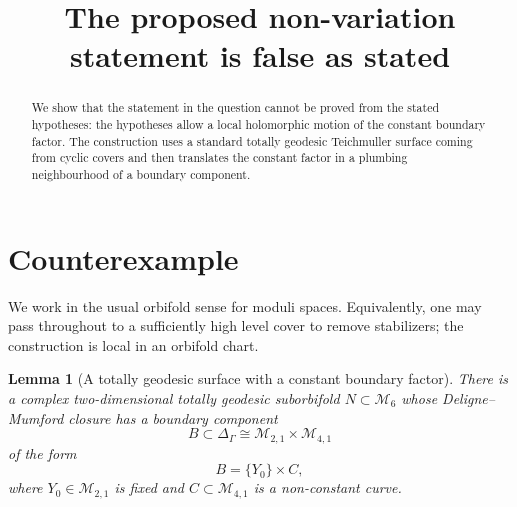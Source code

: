 \documentclass[11pt]{article}
\newtheorem{lemma}{Lemma}
\begin{document}
\title{The proposed non-variation statement is false as stated}
\author{}
\date{}
\maketitle

\begin{abstract}
We show that the statement in the question cannot be proved from the
stated hypotheses: the hypotheses allow a local holomorphic motion of the
constant boundary factor.  The construction uses a standard totally
geodesic Teichmuller surface coming from cyclic covers and then translates
the constant factor in a plumbing neighbourhood of a boundary component.
\end{abstract}

\section*{Counterexample}

We work in the usual orbifold sense for moduli spaces.  Equivalently, one
may pass throughout to a sufficiently high level cover to remove stabilizers;
the construction is local in an orbifold chart.

\begin{lemma}[A totally geodesic surface with a constant boundary factor]
There is a complex two-dimensional totally geodesic suborbifold
\(N\subset \mathcal M_6\) whose Deligne--Mumford closure has a boundary
component
\[
 B\subset \Delta_\Gamma \cong \mathcal M_{2,1}\times \mathcal M_{4,1}
\]
of the form
\[
 B=\{Y_0\}\times C,
\]
where \(Y_0\in \mathcal M_{2,1}\) is fixed and \(C\subset \mathcal M_{4,1}\)
is a non-constant curve.
\end{lemma}
\end{document}
